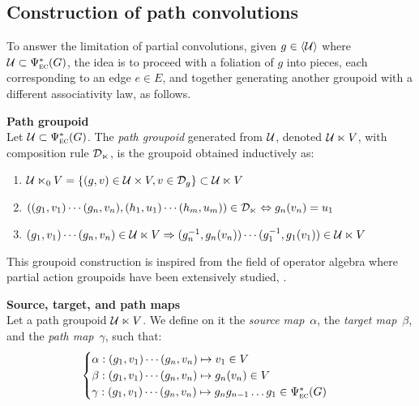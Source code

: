 \subsection{Construction of path convolutions}

To answer the limitation of partial convolutions, given $g \in \langle \mathcal{U} \rangle$ where $\mathcal{U} \subset \Psi_{\operatorname{\textsc{ec}}}^*(G)$, the idea is to proceed with a foliation of $g$ into pieces, each corresponding to an edge $e \in E$, and together generating another groupoid with a different associativity law, as follows.

\begin{definition}\textbf{Path groupoid}\\
Let $\mathcal{U} \subset \Psi_{\operatorname{\textsc{ec}}}^*(G)$. The \emph{path groupoid} generated from $\mathcal{U}$, denoted $\mathcal{U} \ltimes V$, with composition rule $\mathcal{D}_{\ltimes}$, is the groupoid obtained inductively as:
\begin{enumerate}
  \item $\mathcal{U} \ltimes_0 V = \{(g,v) \in \mathcal{U} \times V, v \in \mathcal{D}_g \} \subset \mathcal{U} \ltimes V$
  \item $((g_1,v_1) \cdots (g_n,v_n) , (h_1,u_1) \cdots (h_m,u_m)) \in \mathcal{D}_{\ltimes} \Leftrightarrow g_n(v_n) = u_1$
  \item $(g_1,v_1) \cdots (g_n,v_n) \in \mathcal{U} \ltimes V \Rightarrow (g_n^{-1}, g_n(v_n)) \cdots (g_1^{-1}, g_1(v_1)) \in \mathcal{U} \ltimes V$
\end{enumerate}
\end{definition}

\begin{remark}
This groupoid construction is inspired from the field of operator algebra where partial action groupoids have been extensively studied, \eg \cite{nica1994groupoid,exel1998partial,li2016partial}.
\end{remark}

\begin{definition}\textbf{Source, target, and path maps}\\
Let a path groupoid $\mathcal{U} \ltimes V$. We define on it the \emph{source map}~$\alpha$, the \emph{target map}~$\beta$, and the \emph{path map}~$\gamma$, such that:
\begin{gather*}
\begin{cases}
  \alpha: (g_1,v_1) \cdots (g_n,v_n) \mapsto v_1 \in V\\
  \beta: (g_1,v_1) \cdots (g_n,v_n) \mapsto g_n(v_n) \in V\\
  \gamma: (g_1,v_1) \cdots (g_n,v_n) \mapsto g_ng_{n-1}\ldots g_1 \in \Psi_{\operatorname{\textsc{ec}}}^*(G)
\end{cases}
\end{gather*}
\end{definition}


